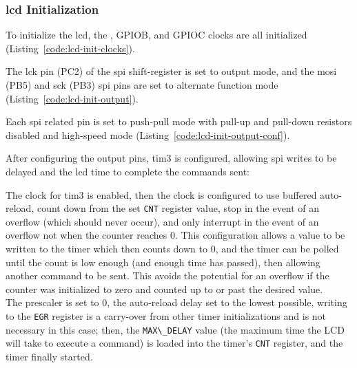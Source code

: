 \subsubsection{\gls{lcd} Initialization}

To initialize the \gls{lcd}, the , GPIOB, and GPIOC clocks are
all initialized (Listing~\ref{code:lcd-init-clocks}).


The \gls{lck} pin (PC2) of the \gls{spi} shift-register is set to output
mode, and the \gls{mosi} (PB5) and \gls{sck} (PB3) \gls{spi} pins are
set to alternate function mode (Listing~\ref{code:lcd-init-output}).


Each \gls{spi} related pin is set to push-pull mode with pull-up and
pull-down resistors disabled and high-speed mode
(Listing~\ref{code:lcd-init-output-conf}).


After configuring the output pins, \gls{tim3} is configured, allowing
\gls{spi} writes to be delayed and the \gls{lcd} time to complete
the commands sent:


The clock for \gls{tim3} is enabled, then the clock is configured to use
buffered auto-reload, count down from the set \lstinline{CNT} register
value, stop in the event of an overflow (which should never occur), and
only interrupt in the event of an overflow not when the counter reaches
0. This configuration allows a value to be written to the timer which
then counts down to 0, and the timer can be polled until the count is
low enough (and enough time has passed), then allowing another command to be
sent. This avoids the potential for an overflow if the counter was
initialized to zero and counted up to or past the desired value. \\

The prescaler is set to 0, the auto-reload delay set to the lowest
possible, writing to the \lstinline{EGR} register is a carry-over from
other timer initializations and is not necessary in this case; then, the
\lstinline{MAX\_DELAY} value (the maximum time the LCD will take to
execute a command) is loaded into the timer's \lstinline{CNT}
register, and the timer finally started.

